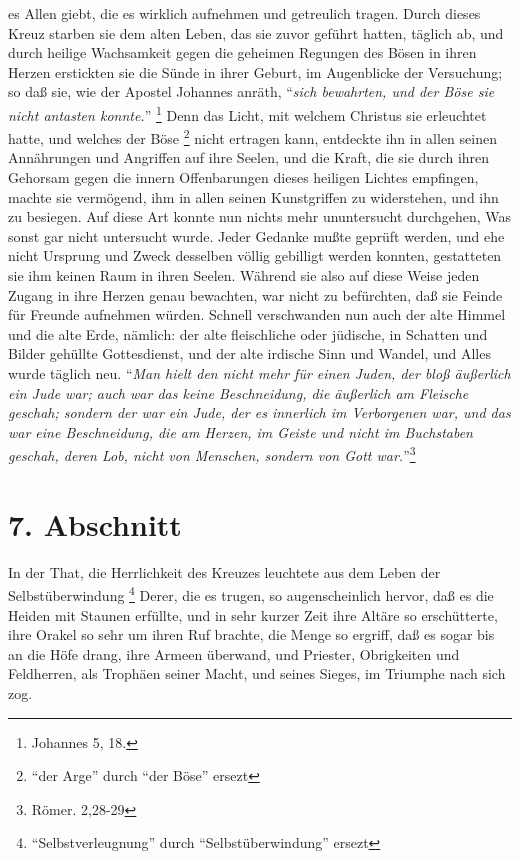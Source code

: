 es Allen giebt, die es wirklich aufnehmen und getreulich tragen. Durch dieses
Kreuz starben sie dem alten Leben, das sie zuvor geführt hatten, täglich ab, und
durch heilige Wachsamkeit gegen die geheimen Regungen des Bösen in ihren Herzen
erstickten sie die Sünde in ihrer Geburt, im Augenblicke der Versuchung; so daß
sie, wie der Apostel Johannes anräth, "`\textit{sich bewahrten, und der Böse sie
nicht antasten konnte.}"' \footnote{Johannes 5, 18.}
Denn das Licht, mit welchem Christus sie erleuchtet hatte, und welches der Böse
\footnote{"`der Arge"' durch "`der Böse"' ersezt}
nicht ertragen kann, entdeckte ihn in allen seinen Annährungen und Angriffen auf
ihre Seelen, und die Kraft, die sie durch ihren Gehorsam gegen die innern
Offenbarungen dieses heiligen Lichtes empfingen, machte sie vermögend, ihm in
allen seinen Kunstgriffen zu widerstehen, und ihn zu besiegen. Auf diese Art
konnte nun nichts mehr ununtersucht durchgehen, Was sonst gar nicht untersucht
wurde. Jeder Gedanke mußte geprüft werden, und ehe nicht Ursprung und Zweck
desselben völlig gebilligt werden konnten, gestatteten sie ihm keinen Raum in
ihren Seelen. Während sie also auf diese Weise jeden Zugang in ihre Herzen genau
bewachten, war nicht zu befürchten, daß sie Feinde für Freunde aufnehmen würden.
Schnell verschwanden nun auch der alte Himmel und die alte Erde, nämlich: der
alte fleischliche oder jüdische, in Schatten und Bilder gehüllte Gottesdienst,
und der alte irdische Sinn und Wandel, und Alles wurde täglich neu.
"`\textit{Man hielt
den nicht mehr für einen Juden, der bloß äußerlich ein Jude war; auch war das
keine Beschneidung, die äußerlich am Fleische geschah; sondern der war ein Jude,
der es innerlich im Verborgenen war, und das war eine Beschneidung, die am
Herzen, im Geiste und nicht im Buchstaben geschah, deren Lob, nicht von
Menschen, sondern von Gott war.}"'\footnote{Römer. 2,28-29}

\section{7. Abschnitt}  \label{kap2_ab7}

In der That, die Herrlichkeit des Kreuzes leuchtete aus dem Leben der
Selbstüberwindung \footnote{"`Selbstverleugnung"' durch "`Selbstüberwindung"'
ersezt} Derer, die es trugen, so augenscheinlich hervor, daß es die
Heiden mit Staunen erfüllte, und in sehr kurzer Zeit ihre Altäre so
erschütterte, ihre Orakel so sehr um ihren Ruf brachte, die Menge so ergriff,
daß es sogar bis an die Höfe drang, ihre Armeen überwand, und Priester,
Obrigkeiten und Feldherren, als Trophäen seiner Macht, und seines Sieges, im
Triumphe nach sich zog.

